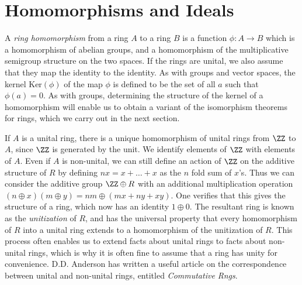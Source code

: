 \section{Homomorphisms and Ideals}

A \emph{ring homomorphism} from a ring $A$ to a ring $B$ is a function $\phi:A \to B$ which is a homomorphism of abelian groups, and a homomorphism of the multiplicative semigroup structure on the two spaces. If the rings are unital, we also assume that they map the identity to the identity. As with groups and vector spaces, the kernel $\text{Ker}(\phi)$ of the map $\phi$ is defined to be the set of all $a$ such that $\phi(a) = 0$. As with groups, determining the structure of the kernel of a homomorphism will enable us to obtain a variant of the isomorphism theorems for rings, which we carry out in the next section.

\begin{example}
    If $A$ is a unital ring, there is a unique homomorphism of unital rings from $\ZZ$ to $A$, since $\ZZ$ is generated by the unit. We identify elements of $\ZZ$ with elements of $A$. Even if $A$ is non-unital, we can still define an action of $\ZZ$ on the additive structure of $R$ by defining $nx = x + \dots + x$ as the $n$ fold sum of $x$'s. Thus we can consider the additive group $\ZZ \oplus R$ with an additional multiplication operation $(n \oplus x)(m \oplus y) = nm \oplus (mx + ny + xy)$. One verifies that this gives the structure of a ring, which now has an identity $1 \oplus 0$. The resultant ring is known as the \emph{unitization} of $R$, and has the universal property that every homomorphism of $R$ into a unital ring extends to a homomorphism of the unitization of $R$. This process often enables us to extend facts about unital rings to facts about non-unital rings, which is why it is often fine to assume that a ring has unity for convenience. D.D. Anderson has written a useful article on the correspondence between unital and non-unital rings, entitled \emph{Commutative Rngs}.
\end{example}

